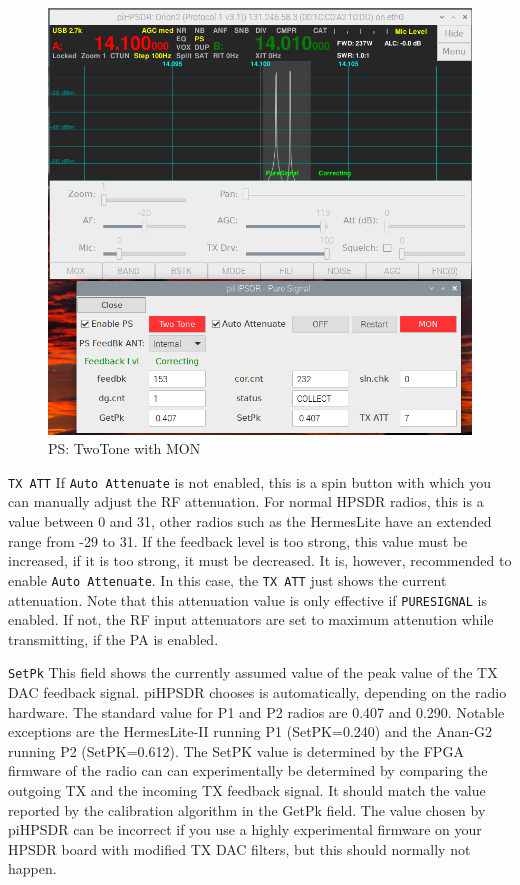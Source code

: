 \documentclass[12pt]{book}
\def\rett#1{\texttt{\color{red}#1}}
\begin{document}
\begin{figure}[t!]
\center
\includegraphics[width=12cm]{PSmon.png}
\caption{PS: TwoTone with MON}
\label{fig:PSmon}
\end{figure}

\rett{TX ATT} If \rett{Auto Attenuate} is not enabled, this is a spin button with which
you can manually adjust the RF attenuation. For normal HPSDR radios, this is a value
between 0 and 31, other radios such as the HermesLite have an extended range from
-29 to 31. If the feedback level is too strong, this value must be increased, if it
is too strong, it must be decreased. It is, however, recommended to enable \rett{Auto Attenuate}.
In this case, the \rett{TX ATT} just shows the current attenuation.
Note that this attenuation value is only effective if \texttt{PURESIGNAL} is enabled.
If not, the RF input attenuators are set to maximum attenution while transmitting, if the
PA is enabled.

\rett{SetPk} This field shows the currently assumed value of the peak value of the TX DAC
feedback signal. piHPSDR chooses is automatically, depending on the radio hardware.
The standard value for P1 and P2 radios are 0.407 and 0.290. Notable exceptions are
the HermesLite-II running P1 (SetPK=0.240) and the Anan-G2 running P2 (SetPK=0.612).
The SetPK value is determined by the FPGA firmware of the radio can can experimentally
be determined by comparing the outgoing TX and the incoming TX feedback signal.
 It should match the value reported
by the calibration algorithm in the GetPk field. The  value
chosen by piHPSDR can be incorrect if you use a highly experimental firmware on your
HPSDR board with modified TX DAC filters, but this should normally not happen.
\end{document}
